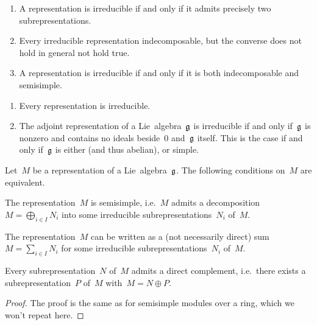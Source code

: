 \begin{remark}
	\leavevmode
	\begin{enumerate}
		\item
			A representation is irreducible if and only if it admits precisely two subrepresentations.
		\item
			Every irreducible representation indecomposable, but the converse does not hold in general not hold true.
		\item
			A representation is irreducible if and only if it is both indecomposable and semisimple.
	\end{enumerate}
\end{remark}


\begin{example}
	\leavevmode
	\begin{enumerate}
		\item
			Every {\onedimensional} representation is irreducible.
		\item
			The adjoint representation of a Lie~algebra~$\mathfrak{g}$ is irreducible if and only if~$\mathfrak{g}$ is nonzero and contains no ideals beside~$0$ and~$\mathfrak{g}$ itself.
			This is the case if and only if~$\mathfrak{g}$ is either {\onedimensional} (and thus abelian), or simple.
	\end{enumerate}
\end{example}


\begin{proposition}
	Let~$M$ be a representation of a Lie~algebra~$\mathfrak{g}$.
	The following conditions on~$M$ are equivalent.
	\begin{equivalenceslist}
		\item
			The representation~$M$ is semisimple, i.e.~$M$ admits a decomposition~$M = \bigoplus_{i \in I} N_i$ into some irreducible subrepresentations~$N_i$ of~$M$.
		\item
			The representation~$M$ can be written as a (not necessarily direct) sum~$M = \sum_{i \in I} N_i$ for some irreducible subrepresentations~$N_i$ of~$M$.
		\item
			Every subrepresentation~$N$ of~$M$ admits a direct complement, i.e.\ there exists a subrepresentation~$P$ of~$M$ with~$M = N \oplus P$.
	\end{equivalenceslist}
\end{proposition}


\begin{proof}
	The proof is the same as for semisimple modules over a ring, which we won’t repeat here.
\end{proof}


